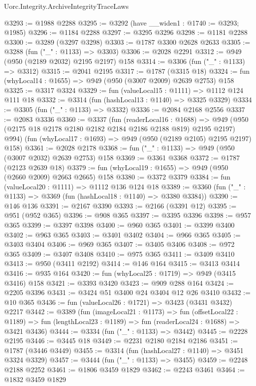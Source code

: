 \begin{lexlean}{Uorc.Integrity.ArchiveIntegrityTraceLaws}
\begin{coremodule}
@3293 := @1988 @2288
@3295 := @3292 (have __widen1 : @1740 := @3293; @1985)
@3296 := @1184 @2288
@3297 := @3295 @3296
@3298 := @1181 @2288
@3300 := @3289 (@3297 @3298)
@3303 := @1787 @3300 @2628 @2633
@3305 := @3288 (fun ("_" : @1133) => @3303)
@3306 := @2028 @2291
@3312 := @949 (@950 (@2189 @2032) @2195 @2197) @158
@3314 := @3306 (fun ("_" : @1133) => @3312)
@3315 := @2041 @2195
@3317 := @1787 (@3315 @18)
@3324 := fun (whyLocal14 : @1655) => @949 (@950 (@3007 @2009) @2639 @2753) @158
@3325 := @3317 @3324
@3329 := fun (valueLocal15 : @1111) => @1112 @124 @111 @18
@3332 := @3314 (fun (hashLocal13 : @1140) => @3325 @3329)
@3334 := @3305 (fun ("_" : @1133) => @3332)
@3336 := @2084 @2168 @2556
@3337 := @2083 @3336
@3360 := @3337
    (fun (readerLocal16 : @1688) =>
    @949 (@950 (@2175 @18 @2178 @2180 @2182 @2184 @2186 @2188 @819) @2195 @2197) @994)
    (fun (whyLocal17 : @1693) => @949 (@950 (@2189 @2105) @2195 @2197) @158)
@3361 := @2028 @2178
@3368 := fun ("_" : @1133) => @949 (@950 (@3007 @2032) @2639 @2753) @158
@3369 := @3361 @3368
@3372 := @1787 (@2123 @2639 @18)
@3379 := fun (whyLocal19 : @1655) => @949 (@950 (@2660 @2009) @2663 @2665) @158
@3380 := @3372 @3379
@3384 := fun (valueLocal20 : @1111) => @1112 @136 @124 @18
@3389 := @3360 (fun ("_" : @1133) => @3369 (fun (hashLocal18 : @1140) => @3380 @3384))
@3390 := @146 @136
@3391 := @2167 @3390
@3393 := @2166 (@3391 @12)
@3395 := @951 (@952 @365)
@3396 := @908 @365
@3397 := @3395 @3396
@3398 := @957 @365
@3399 := @3397 @3398
@3400 := @960 @365
@3401 := @3399 @3400
@3402 := @963 @365
@3403 := @3401 @3402
@3404 := @966 @365
@3405 := @3403 @3404
@3406 := @969 @365
@3407 := @3405 @3406
@3408 := @972 @365
@3409 := @3407 @3408
@3410 := @975 @365
@3411 := @3409 @3410
@3413 := @950 (@3411 @2192)
@3414 := @146 @164
@3415 := @3413 @3414
@3416 := @935 @164
@3420 := fun (whyLocal25 : @1719) => @949 (@3415 @3416) @158
@3421 := @3393 @3420
@3423 := @909 @288 @164
@3424 := @2205 @3396
@3431 := @3424 @51 @3400 @24 @3404 @12 @26 @3410
@3432 := @10 @365
@3436 := fun (valueLocal26 : @1721) => @3423 (@3431 @3432) @2217
@3442 := @3389
    (fun (imageLocal21 : @1173) =>
    fun (offsetLocal22 : @1189) =>
    fun (lengthLocal23 : @1189) => fun (readerLocal24 : @1688) => @3421 @3436)
@3444 := @3334 (fun ("_" : @1133) => @3442)
@3445 := @2228 @2195
@3446 := @3445 @18
@3449 := @2231 @2180 @2184 @2186
@3451 := @1787 (@3446 @3449)
@3455 := @3314 (fun (hashLocal27 : @1140) => @3451 @3324 @3329)
@3457 := @3444 (fun ("_" : @1133) => @3455)
@3459 := @2248 @2188 @2252
@3461 := @1806 @3459 @1829
@3462 := @2243 @3461
@3464 := @1832 @3459 @1829

\end{coremodule}
\end{lexlean}
